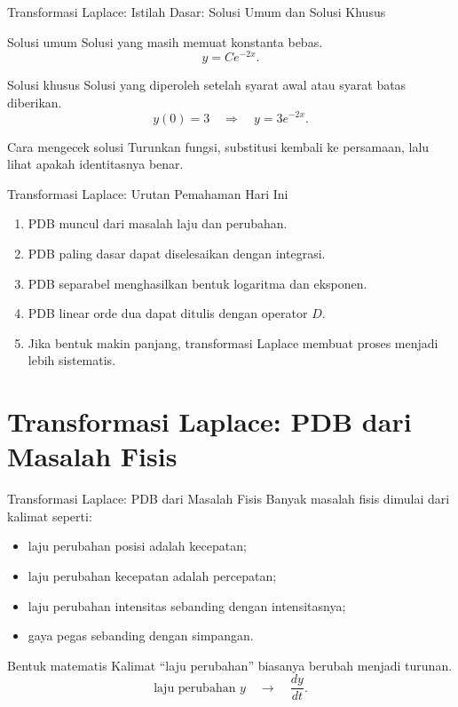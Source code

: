 \documentclass[aspectratio=169,11pt]{beamer}
\begin{document}
\begin{frame}{Transformasi Laplace: Istilah Dasar: Solusi Umum dan Solusi Khusus}
\begin{block}{Solusi umum}
Solusi yang masih memuat konstanta bebas.
\[
y=C e^{-2x}.
\]
\end{block}
\begin{block}{Solusi khusus}
Solusi yang diperoleh setelah syarat awal atau syarat batas diberikan.
\[
y(0)=3 \quad \Rightarrow \quad y=3e^{-2x}.
\]
\end{block}
\begin{alertblock}{Cara mengecek solusi}
Turunkan fungsi, substitusi kembali ke persamaan, lalu lihat apakah identitasnya benar.
\end{alertblock}
\end{frame}

\begin{frame}{Transformasi Laplace: Urutan Pemahaman Hari Ini}
\begin{enumerate}
  \item PDB muncul dari masalah laju dan perubahan.
  \item PDB paling dasar dapat diselesaikan dengan integrasi.
  \item PDB separabel menghasilkan bentuk logaritma dan eksponen.
  \item PDB linear orde dua dapat ditulis dengan operator $D$.
  \item Jika bentuk makin panjang, transformasi Laplace membuat proses menjadi lebih sistematis.
\end{enumerate}
\end{frame}

\section{Transformasi Laplace: PDB dari Masalah Fisis}

\begin{frame}{Transformasi Laplace: PDB dari Masalah Fisis}
Banyak masalah fisis dimulai dari kalimat seperti:
\begin{itemize}
  \item laju perubahan posisi adalah kecepatan;
  \item laju perubahan kecepatan adalah percepatan;
  \item laju perubahan intensitas sebanding dengan intensitasnya;
  \item gaya pegas sebanding dengan simpangan.
\end{itemize}
\begin{block}{Bentuk matematis}
Kalimat ``laju perubahan'' biasanya berubah menjadi turunan.
\[
\text{laju perubahan } y \quad \longrightarrow \quad \frac{dy}{dt}.
\]
\end{block}
\end{frame}
\end{document}
